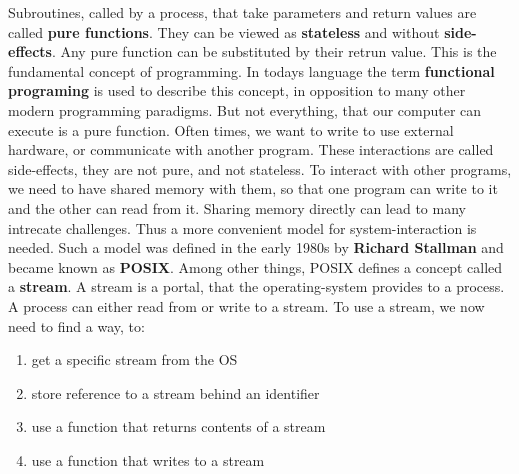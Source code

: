 \documentclass{dcbl/challenge}
\begin{document}
Subroutines, called by a process, that take parameters and return values are called \textbf{pure functions}.
They can be viewed as \textbf{stateless} and without \textbf{side-effects}.
Any pure function can be substituted by their retrun value.
This is the fundamental concept of programming.
In todays language the term \textbf{functional programing} is used to describe this concept, in opposition to many other modern programming paradigms.
But not everything, that our computer can execute is a pure function.
Often times, we want to write to use external hardware, or communicate with another program.
These interactions are called side-effects, they are not pure, and not stateless.
To interact with other programs, we need to have shared memory with them, so that one program can write to it and the other can read from it.
Sharing memory directly can lead to many intrecate challenges.
Thus a more convenient model for system-interaction is needed.
Such a model was defined in the early 1980s by \textbf{Richard Stallman} and became known as \textbf{POSIX}.
Among other things, POSIX defines a concept called a \textbf{stream}.
A stream is a portal, that the operating-system provides to a process. 
A process can either read from or write to a stream.
To use a stream, we now need to find a way, to:
\begin{enumerate}
    \item get a specific stream from the OS
    \item store reference to a stream behind an identifier
    \item use a function that returns contents of a stream
    \item use a function that writes to a stream
\end{enumerate} 
\end{document}
